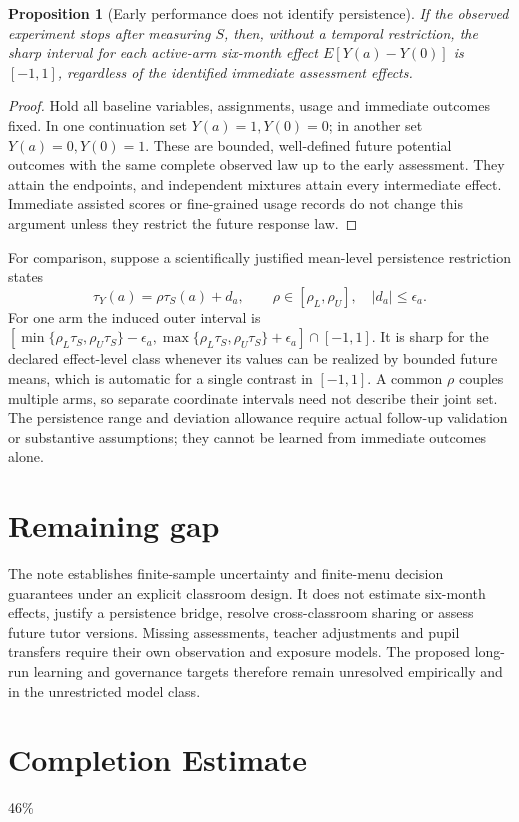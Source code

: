 \documentclass[11pt]{article}
\newtheorem{proposition}[theorem]{Proposition}
\theoremstyle{remark}
\begin{document}
\begin{proposition}[Early performance does not identify persistence]
If the observed experiment stops after measuring $S$, then, without a temporal restriction, the sharp interval for each active-arm six-month effect $E[Y(a)-Y(0)]$ is $[-1,1]$, regardless of the identified immediate assessment effects.
\end{proposition}
\begin{proof}
Hold all baseline variables, assignments, usage and immediate outcomes fixed. In one continuation set $Y(a)=1,Y(0)=0$; in another set $Y(a)=0,Y(0)=1$. These are bounded, well-defined future potential outcomes with the same complete observed law up to the early assessment. They attain the endpoints, and independent mixtures attain every intermediate effect. Immediate assisted scores or fine-grained usage records do not change this argument unless they restrict the future response law.
\end{proof}
For comparison, suppose a scientifically justified mean-level persistence restriction states
\[
 \tau_Y(a)=\rho\tau_S(a)+d_a,\qquad
 \rho\in[\rho_L,\rho_U],\quad |d_a|\le\epsilon_a.
\]
For one arm the induced outer interval is
$[\min\{\rho_L\tau_S,\rho_U\tau_S\}-\epsilon_a,
\max\{\rho_L\tau_S,\rho_U\tau_S\}+\epsilon_a]\cap[-1,1]$.
It is sharp for the declared effect-level class whenever its values can be realized by bounded future means, which is automatic for a single contrast in $[-1,1]$. A common $\rho$ couples multiple arms, so separate coordinate intervals need not describe their joint set. The persistence range and deviation allowance require actual follow-up validation or substantive assumptions; they cannot be learned from immediate outcomes alone.

\section*{Remaining gap}
The note establishes finite-sample uncertainty and finite-menu decision guarantees under an explicit classroom design. It does not estimate six-month effects, justify a persistence bridge, resolve cross-classroom sharing or assess future tutor versions. Missing assessments, teacher adjustments and pupil transfers require their own observation and exposure models. The proposed long-run learning and governance targets therefore remain unresolved empirically and in the unrestricted model class.

\section{Completion Estimate}
46\%
\end{document}
